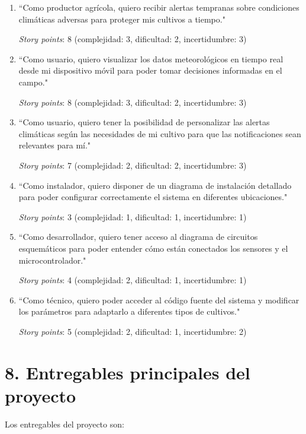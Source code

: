 \documentclass[
11pt, %
codirector, %
]{charter}
\begin{document}
\begin{enumerate}
\item ``Como productor agrícola, quiero recibir alertas tempranas sobre condiciones climáticas adversas para proteger mis cultivos a tiempo."

\textit{Story points}: 8 (complejidad: 3, dificultad: 2, incertidumbre: 3)

\item ``Como usuario, quiero visualizar los datos meteorológicos en tiempo real desde mi dispositivo móvil para poder tomar decisiones informadas en el campo."

\textit{Story points}: 8 (complejidad: 3, dificultad: 2, incertidumbre: 3)

\item ``Como usuario, quiero tener la posibilidad de personalizar las alertas climáticas según las necesidades de mi cultivo para que las notificaciones sean relevantes para mí."

\textit{Story points}: 7 (complejidad: 2, dificultad: 2, incertidumbre: 3)

\item ``Como instalador, quiero disponer de un diagrama de instalación detallado para poder configurar correctamente el sistema en diferentes ubicaciones."

\textit{Story points}: 3 (complejidad: 1, dificultad: 1, incertidumbre: 1)

\item ``Como desarrollador, quiero tener acceso al diagrama de circuitos esquemáticos para poder entender cómo están conectados los sensores y el microcontrolador."

\textit{Story points}: 4 (complejidad: 2, dificultad: 1, incertidumbre: 1)

\item ``Como técnico, quiero poder acceder al código fuente del sistema y modificar los parámetros para adaptarlo a diferentes tipos de cultivos."

\textit{Story points}: 5 (complejidad: 2, dificultad: 1, incertidumbre: 2)

\end{enumerate}

\section{8. Entregables principales del proyecto}
\label{sec:entregables}

Los entregables del proyecto son:
\end{document}
